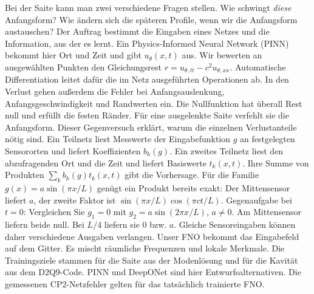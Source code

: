 Bei der Saite kann man zwei verschiedene Fragen stellen. Wie schwingt \emph{diese} Anfangsform? Wie ändern sich die späteren Profile, wenn wir die Anfangsform austauschen? Der Auftrag bestimmt die Eingaben eines Netzes und die Information, aus der es lernt.
Ein Physics-Informed Neural Network (PINN) bekommt hier Ort und Zeit und gibt \(u_\theta(x,t)\) aus. Wir bewerten an ausgewählten Punkten den Gleichungsrest \(r=u_{\theta,tt}-c^2u_{\theta,xx}\). Automatische Differentiation leitet dafür die im Netz ausgeführten Operationen ab. In den Verlust gehen außerdem die Fehler bei Anfangsauslenkung, Anfangsgeschwindigkeit und Randwerten ein. Die Nullfunktion hat überall Rest null und erfüllt die festen Ränder. Für eine ausgelenkte Saite verfehlt sie die Anfangsform. Dieser Gegenversuch erklärt, warum die einzelnen Verlustanteile nötig sind.
Ein Teilnetz liest Messwerte der Eingabefunktion \(g\) an festgelegten Sensororten und liefert Koeffizienten \(b_k(g)\). Ein zweites Teilnetz liest den abzufragenden Ort und die Zeit und liefert Basiswerte \(t_k(x,t)\). Ihre Summe von Produkten \(\sum_k b_k(g)t_k(x,t)\) gibt die Vorhersage. Für die Familie \(g(x)=a\sin(\pi x/L)\) genügt ein Produkt bereits exakt: Der Mittensensor liefert \(a\), der zweite Faktor ist \(\sin(\pi x/L)\cos(\pi ct/L)\). Gegenaufgabe bei \(t=0\): Vergleichen Sie \(g_1=0\) mit \(g_2=a\sin(2\pi x/L)\), \(a\ne0\). Am Mittensensor liefern beide null. Bei \(L/4\) liefern sie 0 bzw. \(a\). Gleiche Sensoreingaben können daher verschiedene Ausgaben verlangen.
Unser FNO bekommt das Eingabefeld auf dem Gitter. Es mischt räumliche Frequenzen und lokale Merkmale. Die Trainingsziele stammen für die Saite aus der Modenlösung und für die Kavität aus dem D2Q9-Code. PINN und DeepONet sind hier Entwurfsalternativen. Die gemessenen CP2-Netzfehler gelten für das tatsächlich trainierte FNO.

